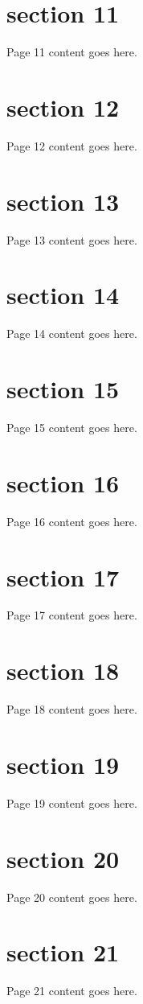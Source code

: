 \documentclass{article}
\begin{document}
\section{section 11}
Page 11 content goes here.
\newpage

\section{section 12}
Page 12 content goes here.
\newpage

\section{section 13}
Page 13 content goes here.
\newpage

\section{section 14}
Page 14 content goes here.
\newpage

\section{section 15}
Page 15 content goes here.
\newpage

\section{section 16}
Page 16 content goes here.
\newpage

\section{section 17}
Page 17 content goes here.
\newpage

\section{section 18}
Page 18 content goes here.
\newpage

\section{section 19}
Page 19 content goes here.
\newpage

\section{section 20}
Page 20 content goes here.
\newpage

\section{section 21}
Page 21 content goes here.
\newpage
\end{document}
